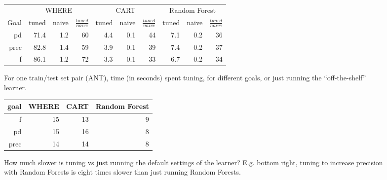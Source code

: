 \begin{figure}[!t]

\renewcommand{\baselinestretch}{0.8}
\scriptsize
\centering
  \begin{tabular}{r@{~}|r@{~}rr|r@{~}rr|r@{~}rr}
    & \multicolumn{3}{c|}{WHERE}&\multicolumn{3}{c|}{CART}& \multicolumn{3}{c}{Random Forest}\\\cline{2-10} 
    Goal & tuned & naive &$\frac{\mathit{tuned}}{\mathit{naive}}$& tuned & naive &$\frac{\mathit{tuned}}{\mathit{naive}}$& tuned & naive&$\frac{\mathit{tuned}}{\mathit{naive}}$\\\hline
pd&71.4&1.2&60&4.4&0.1&44&7.1&0.2&36\\ 
prec&82.8&1.4&59&3.9&0.1&39&7.4&0.2&37\\
f&86.1&1.2&72&3.3&0.1&33&6.7&0.2&34
  \end{tabular}
  \caption{For one train/test set pair (ANT),  time (in seconds) spent tuning,
  for different goals, or just running the ``off-the-shelf'' learner.}
\end{figure}


\begin{figure}[!t]

\renewcommand{\baselinestretch}{0.8}
\scriptsize
\centering
\begin{tabular}{r|rrr}
goal &	WHERE	&CART&	Random Forest\\\hline
f	&15	&13	&9\\ 
pd	&15	&16	&8\\ 
prec&	14	&14	&8
\end{tabular}
\caption{How much slower is tuning vs just running the default
settings of the learner? E.g. bottom right, tuning to increase
precision with Random Forests is eight times slower than
just running Random Forests.}
\end{figure}



